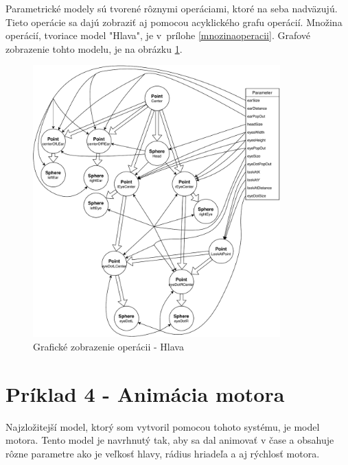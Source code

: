 Parametrické modely sú tvorené rôznymi operáciami, ktoré na seba nadväzujú. Tieto operácie sa dajú zobraziť aj pomocou acyklického grafu operácií. Množina operácií, tvoriace model "Hlava", je v~prílohe \ref{mnozinaoperacii}. Grafové zobrazenie tohto modelu, je na obrázku \ref{fig:headGraph}.
\begin{figure}[H]
	\centering
	\includegraphics[width=0.85\textwidth]{obrazky-figures/Diagram/DP Navrh operacii-Head - Graf.pdf}
	\caption{Grafické zobrazenie operácii - Hlava}
	\label{fig:headGraph}
\end{figure}

\section*{Príklad 4 - Animácia motora}
Najzložitejší model, ktorý som vytvoril pomocou tohoto systému, je model motora. Tento model je navrhnutý tak, aby sa dal animovať v čase a obsahuje rôzne parametre ako je veľkosť hlavy, rádius hriadeľa a aj rýchlosť motora.

